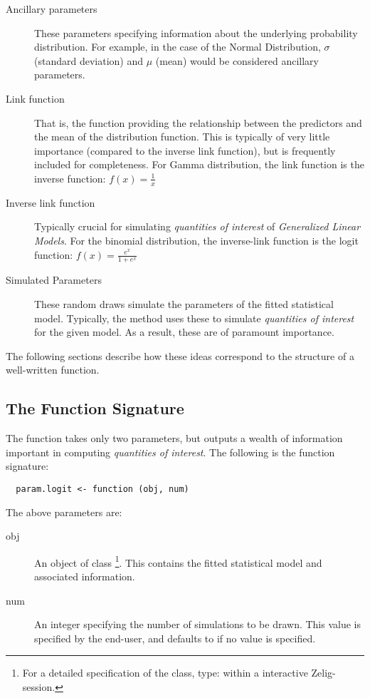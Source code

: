 \begin{description}

	\item[Ancillary parameters] These parameters specifying information about the
		underlying probability distribution. For example, in the case of the Normal
		Distribution, $\sigma$ (standard deviation) and $\mu$ (mean) would be considered ancillary parameters.
	
	\item[Link function] That is, the function providing the relationship between
		the predictors and the mean of the distribution function. This is typically of
		very little importance (compared to the inverse link function), but is frequently included for completeness. For Gamma distribution, the link function is the inverse function: $ f(x) = \frac{1}{x} $
	
	\item[Inverse link function] Typically crucial for simulating \emph{quantities of
		interest} of \emph{Generalized Linear Models}. For the binomial distribution, the inverse-link function is the logit function: $ f(x) = \frac{e^x}{1+e^x} $
	
	\item[Simulated Parameters] These random draws simulate the parameters of the fitted statistical model. Typically, the  method uses these to simulate \emph{quantities of interest} for the given model. As a result, these are of paramount importance.

\end{description}

\noindent The following sections describe how these ideas correspond to the structure of a well-written
 function.

\subsection{The Function Signature}

The  function takes only two parameters, but outputs a wealth of information important in computing \emph{quantities of interest}. The following is the function signature:

\begin{verbatim}
  param.logit <- function (obj, num)
\end{verbatim}

\noindent The above parameters are:

\begin{description}
	\item[obj] An object of class 
		\footnote{
		For a detailed specification of the  class, type:  within a interactive Zelig-session.
		}. This contains the fitted statistical model and associated information.	
			
	\item[num] An integer specifying the number of simulations to be drawn. This value is specified by the end-user, and defaults to  if no value is specified.

\end{description}

